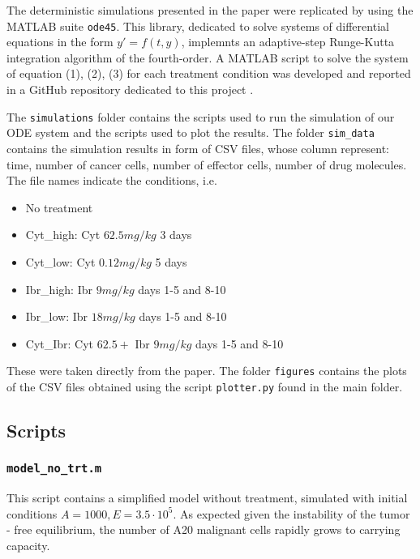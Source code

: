 The deterministic simulations presented in the paper were replicated by using the MATLAB suite \texttt{ode45}. This library, dedicated to solve systems of differential equations in the form $y'=f(t,y)$, implemnts an adaptive-step Runge-Kutta integration algorithm of the fourth-order. 
A MATLAB script to solve the system of equation (1), (2), (3) for each treatment condition was developed and reported in a GitHub repository dedicated to this project \cite{project-repo}.

The \texttt{simulations} folder contains the scripts used to run the simulation of our ODE system and the scripts used to plot the results. The folder \texttt{sim\_data} contains the simulation results in form of CSV files, whose column represent: time, number of cancer cells, number of effector cells, number of drug molecules. The file names indicate the conditions, i.e.
\begin{itemize}
	\item No treatment
	\item Cyt\_high: Cyt $62.5 mg/kg$ 3 days
	\item Cyt\_low: Cyt $0.12 mg/kg$ 5 days
	\item Ibr\_high: Ibr $9 mg/kg$ days 1-5 and 8-10
	\item Ibr\_low: Ibr $18 mg/kg$ days 1-5 and 8-10
	\item Cyt\_Ibr: Cyt $62.5 +$ Ibr $9 mg/kg$ days 1-5 and 8-10
\end{itemize}
These were taken directly from the paper. The folder \texttt{figures} contains the plots of the CSV files obtained using the script \texttt{plotter.py} found in the main folder.\\

\subsection{Scripts}

\subsubsection{\texttt{model\_no\_trt.m}}
This script contains a simplified model without treatment, simulated with initial conditions $A = 1000,E = 3.5 \cdot 10^{5}$. As expected given the instability of the tumor - free equilibrium, the number of A20 malignant cells rapidly grows to carrying capacity.

